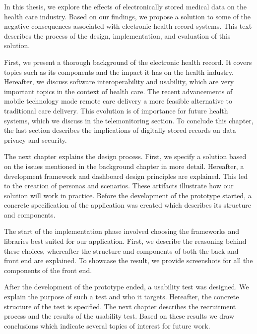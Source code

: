 In this thesis, we explore the effects of electronically stored medical data on the health care industry. Based on our findings, we propose a solution to some of the negative consequences associated with electronic health record systems. This text describes the process of the design, implementation, and evaluation of this solution.

First, we present a thorough background of the electronic health record. It covers topics such as its components and the impact it has on the health industry. Hereafter, we discuss software interoperability and usability, which are very important topics in the context of health care. The recent advancements of mobile technology made remote care delivery a more feasible alternative to traditional care delivery. This evolution is of importance for future health systems, which we discuss in the telemonitoring section. To conclude this chapter, the last section describes the implications of digitally stored records on data privacy and security.

The next chapter explains the design process. First, we specify a solution based on the issues mentioned in the background chapter in more detail. Hereafter, a development framework and dashboard design principles are explained. This led to the creation of personas and scenarios. These artifacts illustrate how our solution will work in practice. Before the development of the prototype started, a concrete specification of the application was created which describes its structure and components.

The start of the implementation phase involved choosing the frameworks and libraries best suited for our application. First, we describe the reasoning behind these choices, whereafter the structure and components of both the back and front end are explained. To showcase the result, we provide screenshots for all the components of the front end.

After the development of the prototype ended, a usability test was designed. We explain the purpose of such a test and who it targets. Hereafter, the concrete structure of the test is specified. The next chapter describes the recruitment process and the results of the usability test. Based on these results we draw conclusions which indicate several topics of interest for future work.
